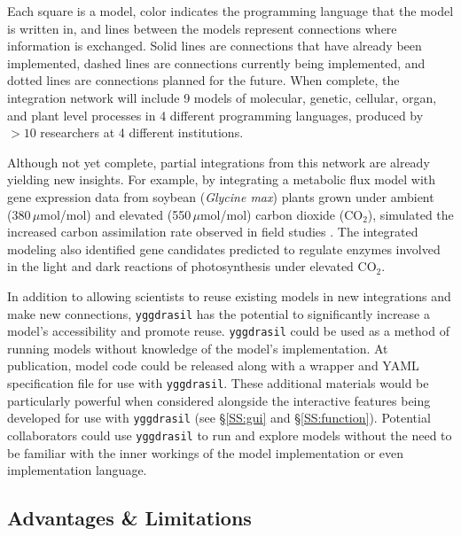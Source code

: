 \documentclass[journal]{IEEEtran}
\newcommand{\pkg}{{\tt yggdrasil}{}}
\begin{document}
\fi
%
Each square is a model, color indicates the programming language that the model is written in, and lines between the models represent connections where information is exchanged. Solid lines are connections that have already been implemented, dashed lines are connections currently being implemented, and dotted lines are connections planned for the future. When complete, the integration network will include 9 models of molecular, genetic, cellular, organ, and plant level processes in 4 different programming languages, produced by $>10$ researchers at 4 different institutions. 

Although not yet complete, partial integrations from this network are already yielding new insights. For example, by integrating a metabolic flux model  with gene expression data from soybean (\emph{Glycine max}) plants grown under ambient (380\,$\mu$mol/mol) and elevated (550\,$\mu$mol/mol) carbon dioxide (CO$_2$), 
%
\ifieee
	\citep{integration_prep} 
\else
	\citet{integration_prep} 
\fi
%
simulated the increased carbon assimilation rate observed in field studies \citep{Bernacchi2005}. The integrated modeling also identified gene candidates predicted to regulate enzymes involved in the light and dark reactions of photosynthesis under elevated CO$_2$.

In addition to allowing scientists to reuse existing models in new integrations and make new connections, {\pkg} has the potential to significantly increase a model's accessibility and promote reuse. {\pkg} could be used as a method of running models without knowledge of the model's implementation. At publication, model code could be released along with a wrapper and YAML specification file for use with {\pkg}. These additional materials would be particularly powerful when considered alongside the interactive features being developed for use with {\pkg} (see \S\ref{SS:gui} and \S\ref{SS:function}). Potential collaborators could use {\pkg} to run and explore models without the need to be familiar with the inner workings of the model implementation or even implementation language.

%
\subsection{Advantages \& Limitations}\label{SS:uses}
%
\end{document}
